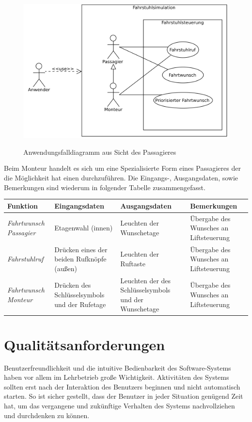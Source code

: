 \begin{figure}[hbt]
	\includegraphics{images/passagierAWF.png}
	\label{fig:passagierAWF}
	\caption{Anwendungsfalldiagramm aus Sicht des Passagieres}
\end{figure}
Beim Monteur handelt es sich um eine Spezialisierte Form eines Passagieres der die Möglichkeit hat einen  durchzuführen.
Die Eingangs-, Ausgangsdaten, sowie Bemerkungen sind wiederum in folgender Tabelle zusammengefasst.

 {
\vspace{1cm}
\hspace{-0,5cm}
\footnotesize
\begin{tabular}{|p{2cm}|p{3cm}|p{3cm}|p{3cm}|}
	\hline
		\textbf{Funktion} &
		\textbf{Eingangsdaten} &
		\textbf{Ausgangsdaten} &
		\textbf{Bemerkungen} \\
	\hline \hline
		\textit{Fahrtwunsch \newline Passagier} &
		Etagenwahl (innen) &
		Leuchten der Wunschetage &
		Übergabe des Wunsches an Liftsteuerung \\
	\hline
		\textit{Fahrstuhlruf} &
		Drücken eines der beiden Rufknöpfe (außen) &
		Leuchten der Ruftaste &
		Übergabe des Wunsches an Liftsteuerung  \\
	\hline
		\textit{Fahrtwunsch \newline Monteur} &
		Drücken des Schlüsselsymbols und der Rufetage &
		Leuchten der des Schlüsselsymbols und der Wunschetage &
		Übergabe des Wunsches an Liftsteuerung  \\
	\hline
\end{tabular}
}

\section{Qualitätsanforderungen}
Benutzerfreundlichkeit und die intuitive Bedienbarkeit des Software-Systems haben vor allem im Lehrbetrieb große Wichtigkeit. Aktivitäten des Systems sollten erst nach der Interaktion des Benutzers beginnen und nicht automatisch starten. So ist sicher gestellt, dass der Benutzer in jeder Situation genügend Zeit hat, um das vergangene und zukünftige Verhalten des Systems nachvollziehen und durchdenken zu können. 

